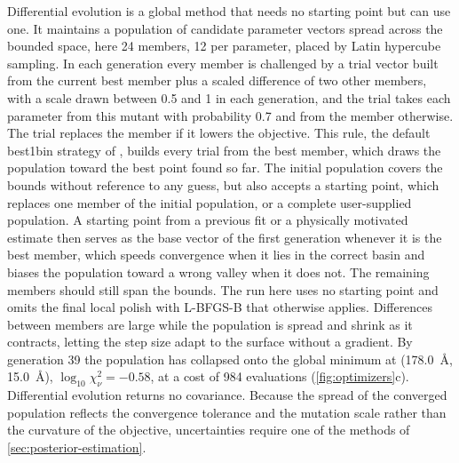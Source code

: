 Differential evolution is a global method that needs no starting point but can use one.\autocite{stornDifferentialEvolutionSimple1997} It maintains a population of candidate parameter vectors spread across the bounded space, here 24 members, 12 per parameter, placed by Latin hypercube sampling. In each generation every member is challenged by a trial vector built from the current best member plus a scaled difference of two other members, with a scale drawn between 0.5 and 1 in each generation, and the trial takes each parameter from this mutant with probability 0.7 and from the member otherwise. The trial replaces the member if it lowers the objective. This rule, the default best1bin strategy of , builds every trial from the best member, which draws the population toward the best point found so far. The initial population covers the bounds without reference to any guess, but  also accepts a starting point, which replaces one member of the initial population, or a complete user-supplied population. A starting point from a previous fit or a physically motivated estimate then serves as the base vector of the first generation whenever it is the best member, which speeds convergence when it lies in the correct basin and biases the population toward a wrong valley when it does not. The remaining members should still span the bounds. The run here uses no starting point and omits the final local polish with L-BFGS-B that  otherwise applies. Differences between members are large while the population is spread and shrink as it contracts, letting the step size adapt to the surface without a gradient. By generation 39 the population has collapsed onto the global minimum at (\qty{178.0}{\angstrom}, \qty{15.0}{\angstrom}), \(\log_{10}\chi_{\nu}^{2} = - 0.58\), at a cost of 984 evaluations (\cref{fig:optimizers}c). Differential evolution returns no covariance. Because the spread of the converged population reflects the convergence tolerance and the mutation scale rather than the curvature of the objective, uncertainties require one of the methods of \cref{sec:posterior-estimation}.

